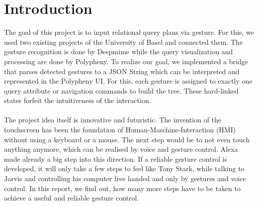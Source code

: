 \section{Introduction}
\label{g1:sec:introduction}  %

The goal of this project is to input relational query plans via gesture. For this, we used two existing projects of the University of Basel and connected them. The gesture recognition is done by Deepmime while the query visualization and processing are done by Polypheny. To realize our goal, we implemented a bridge that parses detected gestures to a JSON String which can be interpreted and represented in the Polypheny UI. For this, each gesture is assigned to exactly one query attribute or navigation commands to build the tree. These hard-linked states forfeit the intuitiveness of the interaction.
\\
\\
The project idea itself is innovative and futuristic. The invention of the touchscreen has been the foundation of Human-Maschine-Interaction (HMI) without using a keyboard or a mouse. The next step would be to not even touch anything anymore, which can be realised by voice and gesture control. Alexa made already a big step into this direction. If a reliable gesture control is developed, it will only take a few steps to feel like Tony Stark, while talking to Jarvis and controlling his computer free handed and only by gestures and voice control. In this report, we find out, how many more steps have to be taken to achieve a useful and reliable gesture control.

